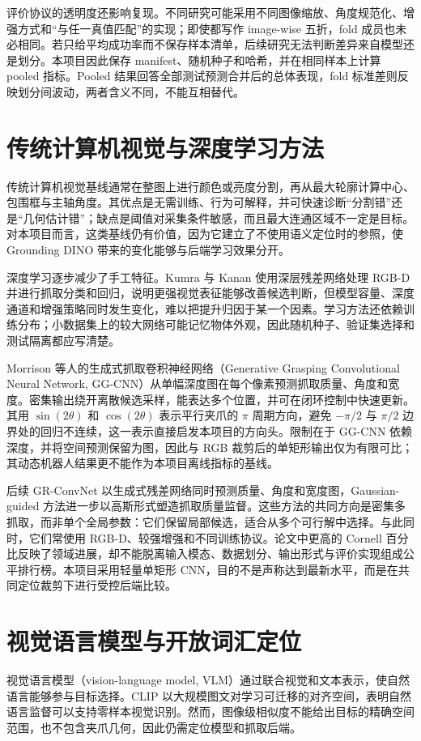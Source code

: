 \documentclass{l4proj}
\begin{document}
评价协议的透明度还影响复现。不同研究可能采用不同图像缩放、角度规范化、增强方式和“与任一真值匹配”的实现；即使都写作 image-wise 五折，fold 成员也未必相同。若只给平均成功率而不保存样本清单，后续研究无法判断差异来自模型还是划分。本项目因此保存 manifest、随机种子和哈希，并在相同样本上计算 pooled 指标。Pooled 结果回答全部测试预测合并后的总体表现，fold 标准差则反映划分间波动，两者含义不同，不能互相替代。

\section{传统计算机视觉与深度学习方法}
传统计算机视觉基线通常在整图上进行颜色或亮度分割，再从最大轮廓计算中心、包围框与主轴角度。其优点是无需训练、行为可解释，并可快速诊断“分割错”还是“几何估计错”；缺点是阈值对采集条件敏感，而且最大连通区域不一定是目标。对本项目而言，这类基线仍有价值，因为它建立了不使用语义定位时的参照，使 Grounding DINO 带来的变化能够与后端学习效果分开。

深度学习逐步减少了手工特征。Kumra 与 Kanan 使用深层残差网络处理 RGB-D 并进行抓取分类和回归\citep{kumra2017robotic}，说明更强视觉表征能够改善候选判断，但模型容量、深度通道和增强策略同时发生变化，难以把提升归因于某一个因素。学习方法还依赖训练分布；小数据集上的较大网络可能记忆物体外观，因此随机种子、验证集选择和测试隔离都应写清楚。

Morrison 等人的生成式抓取卷积神经网络（Generative Grasping Convolutional Neural Network, GG-CNN）从单幅深度图在每个像素预测抓取质量、角度和宽度\citep{morrison2018closing}。密集输出绕开离散候选采样，能表达多个位置，并可在闭环控制中快速更新。其用 $\sin(2\theta)$ 和 $\cos(2\theta)$ 表示平行夹爪的 $\pi$ 周期方向，避免 $-\pi/2$ 与 $\pi/2$ 边界处的回归不连续，这一表示直接启发本项目的方向头。限制在于 GG-CNN 依赖深度，并将空间预测保留为图，因此与 RGB 裁剪后的单矩形输出仅为有限可比；其动态机器人结果更不能作为本项目离线指标的基线。

后续 GR-ConvNet 以生成式残差网络同时预测质量、角度和宽度图\citep{kumra2020antipodal}，Gaussian-guided 方法进一步以高斯形式塑造抓取质量监督\citep{li2022gaussian}。这些方法的共同方向是密集多抓取，而非单个全局参数：它们保留局部候选，适合从多个可行解中选择。与此同时，它们常使用 RGB-D、较强增强和不同训练协议。论文中更高的 Cornell 百分比反映了领域进展，却不能脱离输入模态、数据划分、输出形式与评价实现组成公平排行榜。本项目采用轻量单矩形 CNN，目的不是声称达到最新水平，而是在共同定位裁剪下进行受控后端比较。

\section{视觉语言模型与开放词汇定位}
视觉语言模型（vision-language model, VLM）通过联合视觉和文本表示，使自然语言能够参与目标选择。CLIP 以大规模图文对学习可迁移的对齐空间，表明自然语言监督可以支持零样本视觉识别\citep{radford2021learning}。然而，图像级相似度不能给出目标的精确空间范围，也不包含夹爪几何，因此仍需定位模型和抓取后端。
\end{document}
